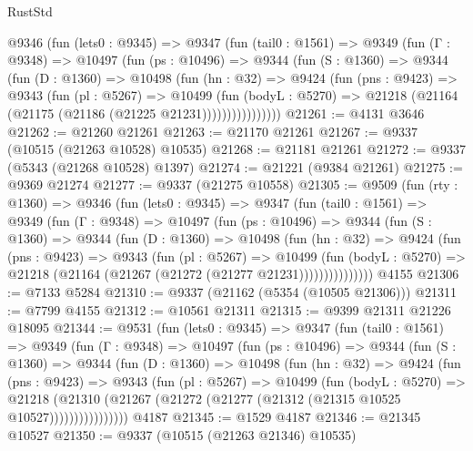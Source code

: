 \begin{lexlean}{RustStd}
\begin{coremodule}
      @9346
        (fun (lets0 : @9345) =>
        @9347
          (fun (tail0 : @1561) =>
          @9349
            (fun (Γ : @9348) =>
            @10497
              (fun (ps : @10496) =>
              @9344
                (fun (S : @1360) =>
                @9344
                  (fun (D : @1360) =>
                  @10498
                    (fun (hn : @32) =>
                    @9424
                      (fun (pns : @9423) =>
                      @9343
                        (fun (pl : @5267) =>
                        @10499
                          (fun (bodyL : @5270) =>
                          @21218 (@21164 (@21175 (@21186 (@21225 @21231))))))))))))))))
@21261 := @4131 @3646
@21262 := @21260 @21261
@21263 := @21170 @21261
@21267 := @9337 (@10515 (@21263 @10528) @10535)
@21268 := @21181 @21261
@21272 := @9337 (@5343 (@21268 @10528) @1397)
@21274 := @21221 (@9384 @21261)
@21275 := @9369 @21274
@21277 := @9337 (@21275 @10558)
@21305 := @9509
    (fun (rty : @1360) =>
    @9346
      (fun (lets0 : @9345) =>
      @9347
        (fun (tail0 : @1561) =>
        @9349
          (fun (Γ : @9348) =>
          @10497
            (fun (ps : @10496) =>
            @9344
              (fun (S : @1360) =>
              @9344
                (fun (D : @1360) =>
                @10498
                  (fun (hn : @32) =>
                  @9424
                    (fun (pns : @9423) =>
                    @9343
                      (fun (pl : @5267) =>
                      @10499
                        (fun (bodyL : @5270) =>
                        @21218 (@21164 (@21267 (@21272 (@21277 @21231)))))))))))))))
    @4155
@21306 := @7133 @5284
@21310 := @9337 (@21162 (@5354 (@10505 @21306)))
@21311 := @7799 @4155
@21312 := @10561 @21311
@21315 := @9399 @21311 @21226 @18095
@21344 := @9531
    (fun (lets0 : @9345) =>
    @9347
      (fun (tail0 : @1561) =>
      @9349
        (fun (Γ : @9348) =>
        @10497
          (fun (ps : @10496) =>
          @9344
            (fun (S : @1360) =>
            @9344
              (fun (D : @1360) =>
              @10498
                (fun (hn : @32) =>
                @9424
                  (fun (pns : @9423) =>
                  @9343
                    (fun (pl : @5267) =>
                    @10499
                      (fun (bodyL : @5270) =>
                      @21218
                        (@21310
                          (@21267 (@21272 (@21277 (@21312 (@21315 @10525 @10527))))))))))))))))
    @4187
@21345 := @1529 @4187
@21346 := @21345 @10527
@21350 := @9337 (@10515 (@21263 @21346) @10535)

\end{coremodule}
\end{lexlean}
